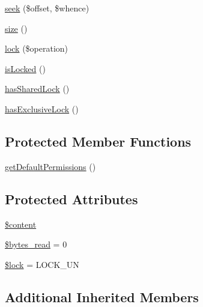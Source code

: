 \begin{DoxyCompactItemize}
\item 
\mbox{\hyperlink{classorg_1_1bovigo_1_1vfs_1_1vfs_stream_file_a5bcf2f96139781f973c20f7bdb8ec7dd}{seek}} (\$offset, \$whence)
\item 
\mbox{\hyperlink{classorg_1_1bovigo_1_1vfs_1_1vfs_stream_file_a775bfb88c1bb7975d67f277eade2a1b7}{size}} ()
\item 
\mbox{\hyperlink{classorg_1_1bovigo_1_1vfs_1_1vfs_stream_file_af3e43f76e3c009eed74a75862b67f04e}{lock}} (\$operation)
\item 
\mbox{\hyperlink{classorg_1_1bovigo_1_1vfs_1_1vfs_stream_file_a19e2d3d0e9debed234d72c560f99b5f2}{is\+Locked}} ()
\item 
\mbox{\hyperlink{classorg_1_1bovigo_1_1vfs_1_1vfs_stream_file_a58b9232a345353da75f321b5df95c1c0}{has\+Shared\+Lock}} ()
\item 
\mbox{\hyperlink{classorg_1_1bovigo_1_1vfs_1_1vfs_stream_file_a7bf2c8851d1b43ef8e84f810e2697478}{has\+Exclusive\+Lock}} ()
\end{DoxyCompactItemize}
\subsection*{Protected Member Functions}
\begin{DoxyCompactItemize}
\item 
\mbox{\hyperlink{classorg_1_1bovigo_1_1vfs_1_1vfs_stream_file_a5a7e3863035fc9138bf0c7c486a472cb}{get\+Default\+Permissions}} ()
\end{DoxyCompactItemize}
\subsection*{Protected Attributes}
\begin{DoxyCompactItemize}
\item 
\mbox{\hyperlink{classorg_1_1bovigo_1_1vfs_1_1vfs_stream_file_a57b284fe00866494b33afa80ba729bed}{\$content}}
\item 
\mbox{\hyperlink{classorg_1_1bovigo_1_1vfs_1_1vfs_stream_file_a12b758ba8ad2f1276cb3ff793f14a878}{\$bytes\+\_\+read}} = 0
\item 
\mbox{\hyperlink{classorg_1_1bovigo_1_1vfs_1_1vfs_stream_file_af42e78ece9ec638f2928b3bef452d3e1}{\$lock}} = L\+O\+C\+K\+\_\+\+UN
\end{DoxyCompactItemize}
\subsection*{Additional Inherited Members}


